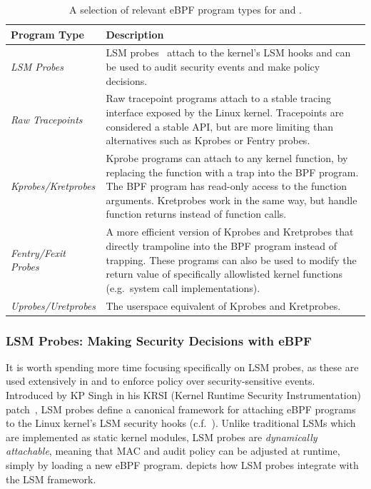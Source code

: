 \begingroup\footnotesize
\begin{longtable}[c]{lp{4.2in}}
\caption{A selection of relevant eBPF program types for \bpfbox{} and \bpfcontain{}.}%
\label{tab:program-types}\\
  \toprule
  Program Type & Description\\
  \midrule
  \textit{LSM Probes}          & LSM probes~\cite{singh2019_krsi} attach to the kernel's LSM hooks and can be used to audit security events and make policy decisions.\\
  \textit{Raw Tracepoints}     & Raw tracepoint programs attach to a stable tracing interface exposed by the Linux kernel. Tracepoints are considered a stable API, but are more limiting than alternatives such as Kprobes or Fentry probes.\\
  \textit{Kprobes/Kretprobes}  & Kprobe programs can attach to any kernel function, by replacing the function with a trap into the BPF program. The BPF program has read-only access to the function arguments. Kretprobes work in the same way, but handle function returns instead of function calls.\\
  \textit{Fentry/Fexit Probes} & A more efficient version of Kprobes and Kretprobes that directly trampoline into the BPF program instead of trapping. These programs can also be used to modify the return value of specifically allowlisted kernel functions (e.g.~system call implementations).\\
  \textit{Uprobes/Uretprobes}  & The userspace equivalent of Kprobes and Kretprobes.\\
  \bottomrule
\end{longtable}
\endgroup

\subsubsection*{LSM Probes: Making Security Decisions with eBPF}

It is worth spending more time focusing specifically on LSM probes, as these are used
extensively in \bpfbox{} and \bpfcontain{} to enforce policy over security-sensitive
events. Introduced by KP Singh in his KRSI (Kernel Runtime Security Instrumentation)
patch~\cite{singh2019_krsi}, LSM probes define a canonical framework for attaching eBPF
programs to the Linux kernel's LSM security hooks (c.f.~). Unlike
traditional LSMs which are implemented as static kernel modules, LSM probes are
\textit{dynamically attachable}, meaning that MAC and audit policy can be adjusted at
runtime, simply by loading a new eBPF program.   depicts how LSM probes
integrate with the LSM framework.

